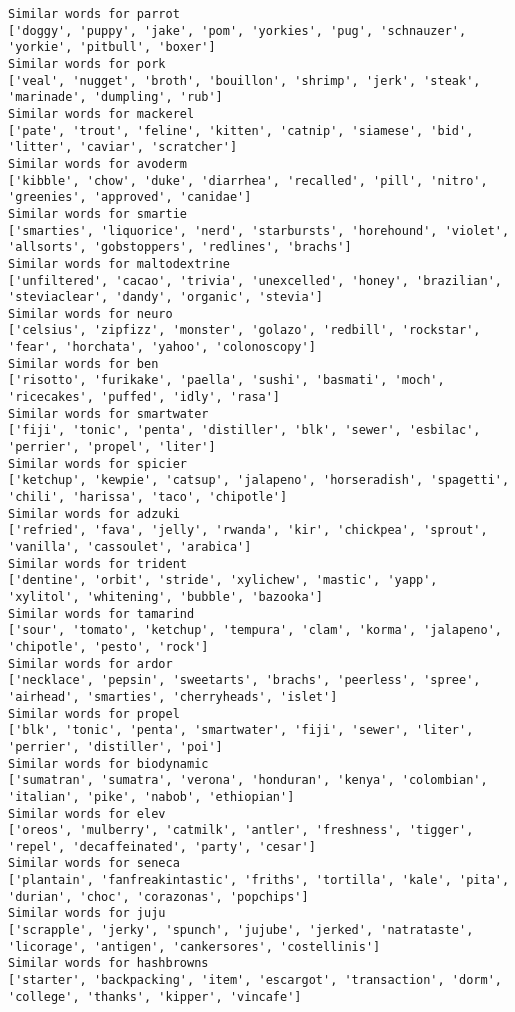 \documentclass[11pt]{article}
\begin{document}
\begin{Verbatim}[commandchars=\\\{\}]
Similar words for parrot
['doggy', 'puppy', 'jake', 'pom', 'yorkies', 'pug', 'schnauzer', 'yorkie', 'pitbull', 'boxer']
Similar words for pork
['veal', 'nugget', 'broth', 'bouillon', 'shrimp', 'jerk', 'steak', 'marinade', 'dumpling', 'rub']
Similar words for mackerel
['pate', 'trout', 'feline', 'kitten', 'catnip', 'siamese', 'bid', 'litter', 'caviar', 'scratcher']
Similar words for avoderm
['kibble', 'chow', 'duke', 'diarrhea', 'recalled', 'pill', 'nitro', 'greenies', 'approved', 'canidae']
Similar words for smartie
['smarties', 'liquorice', 'nerd', 'starbursts', 'horehound', 'violet', 'allsorts', 'gobstoppers', 'redlines', 'brachs']
Similar words for maltodextrine
['unfiltered', 'cacao', 'trivia', 'unexcelled', 'honey', 'brazilian', 'steviaclear', 'dandy', 'organic', 'stevia']
Similar words for neuro
['celsius', 'zipfizz', 'monster', 'golazo', 'redbill', 'rockstar', 'fear', 'horchata', 'yahoo', 'colonoscopy']
Similar words for ben
['risotto', 'furikake', 'paella', 'sushi', 'basmati', 'moch', 'ricecakes', 'puffed', 'idly', 'rasa']
Similar words for smartwater
['fiji', 'tonic', 'penta', 'distiller', 'blk', 'sewer', 'esbilac', 'perrier', 'propel', 'liter']
Similar words for spicier
['ketchup', 'kewpie', 'catsup', 'jalapeno', 'horseradish', 'spagetti', 'chili', 'harissa', 'taco', 'chipotle']
Similar words for adzuki
['refried', 'fava', 'jelly', 'rwanda', 'kir', 'chickpea', 'sprout', 'vanilla', 'cassoulet', 'arabica']
Similar words for trident
['dentine', 'orbit', 'stride', 'xylichew', 'mastic', 'yapp', 'xylitol', 'whitening', 'bubble', 'bazooka']
Similar words for tamarind
['sour', 'tomato', 'ketchup', 'tempura', 'clam', 'korma', 'jalapeno', 'chipotle', 'pesto', 'rock']
Similar words for ardor
['necklace', 'pepsin', 'sweetarts', 'brachs', 'peerless', 'spree', 'airhead', 'smarties', 'cherryheads', 'islet']
Similar words for propel
['blk', 'tonic', 'penta', 'smartwater', 'fiji', 'sewer', 'liter', 'perrier', 'distiller', 'poi']
Similar words for biodynamic
['sumatran', 'sumatra', 'verona', 'honduran', 'kenya', 'colombian', 'italian', 'pike', 'nabob', 'ethiopian']
Similar words for elev
['oreos', 'mulberry', 'catmilk', 'antler', 'freshness', 'tigger', 'repel', 'decaffeinated', 'party', 'cesar']
Similar words for seneca
['plantain', 'fanfreakintastic', 'friths', 'tortilla', 'kale', 'pita', 'durian', 'choc', 'corazonas', 'popchips']
Similar words for juju
['scrapple', 'jerky', 'spunch', 'jujube', 'jerked', 'natrataste', 'licorage', 'antigen', 'cankersores', 'costellinis']
Similar words for hashbrowns
['starter', 'backpacking', 'item', 'escargot', 'transaction', 'dorm', 'college', 'thanks', 'kipper', 'vincafe']

\end{Verbatim}
\end{document}
